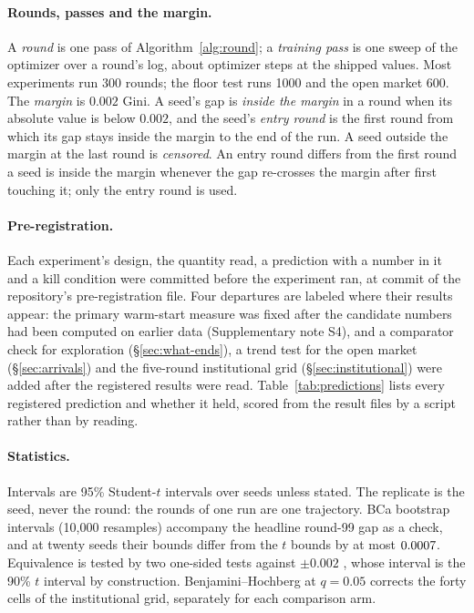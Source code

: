 \paragraph{Rounds, passes and the margin.} A \emph{round} is one pass of
Algorithm~\ref{alg:round}; a \emph{training pass} is one sweep of the optimizer
over a round's log, about \stepsPerPass{} optimizer steps at the shipped values. Most
experiments run 300 rounds; the floor test runs 1000 and the open market 600. The
\emph{margin} is $0.002$ Gini. A seed's gap is \emph{inside the margin} in a round
when its absolute value is below $0.002$, and the seed's \emph{entry round} is the
first round from which its gap stays inside the margin to the end of the run. A
seed outside the margin at the last round is \emph{censored}. An entry round
differs from the first round a seed is inside the margin whenever the gap
re-crosses the margin after first touching it; only the entry round is used.

\paragraph{Pre-registration.} Each experiment's design, the quantity read, a
prediction with a number in it and a kill condition were committed before the
experiment ran, at commit \texttt{\regCommit} of the repository's
pre-registration file. Four departures are labeled where their results appear:
the primary warm-start measure was fixed after the candidate numbers had been
computed on earlier data (Supplementary note S4), and a comparator check for
exploration (\S\ref{sec:what-ends}), a trend test for the open market
(\S\ref{sec:arrivals}) and the five-round institutional grid
(\S\ref{sec:institutional}) were added after the registered results were read.
Table~\ref{tab:predictions} lists every registered prediction and whether it
held, scored from the result files by a script rather than by reading.

\paragraph{Statistics.} Intervals are 95\% Student-$t$ intervals over seeds
unless stated. The replicate is the seed, never the round: the rounds of one run
are one trajectory. BCa bootstrap intervals (10{,}000 resamples) accompany the
headline round-99 gap as a check, and at twenty seeds their bounds differ from the
$t$ bounds by at most $0.0007$. Equivalence is tested by two one-sided tests
against $\pm 0.002$ \citep{lakens2017}, whose interval is the 90\% $t$ interval by
construction. Benjamini--Hochberg at $q = 0.05$ corrects the forty cells of the
institutional grid, separately for each comparison arm.

